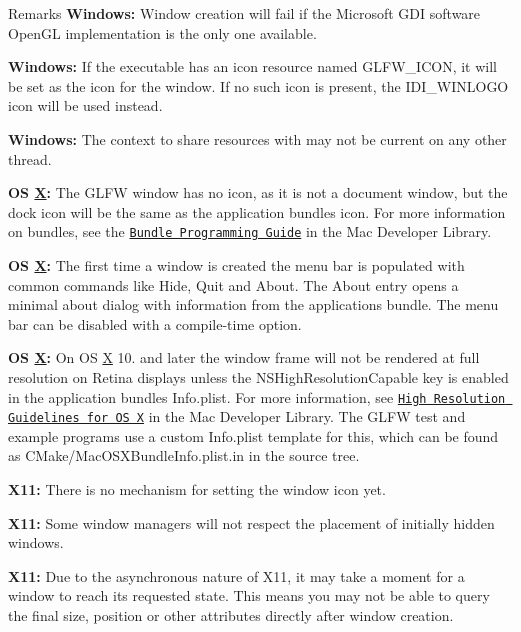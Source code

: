 \begin{DoxyRemark}{Remarks}
{\bfseries Windows\+:} Window creation will fail if the Microsoft G\+D\+I software Open\+G\+L implementation is the only one available.

{\bfseries Windows\+:} If the executable has an icon resource named {\ttfamily G\+L\+F\+W\+\_\+\+I\+C\+O\+N,} it will be set as the icon for the window. If no such icon is present, the {\ttfamily I\+D\+I\+\_\+\+W\+I\+N\+L\+O\+G\+O} icon will be used instead.

{\bfseries Windows\+:} The context to share resources with may not be current on any other thread.

{\bfseries O\+S \hyperlink{structX}{X}\+:} The G\+L\+F\+W window has no icon, as it is not a document window, but the dock icon will be the same as the application bundle\textquotesingle{}s icon. For more information on bundles, see the \href{https://developer.apple.com/library/mac/documentation/CoreFoundation/Conceptual/CFBundles/}{\tt Bundle Programming Guide} in the Mac Developer Library.

{\bfseries O\+S \hyperlink{structX}{X}\+:} The first time a window is created the menu bar is populated with common commands like Hide, Quit and About. The About entry opens a minimal about dialog with information from the application\textquotesingle{}s bundle. The menu bar can be disabled with a compile-\/time option.

{\bfseries O\+S \hyperlink{structX}{X}\+:} On O\+S \hyperlink{structX}{X} 10. and later the window frame will not be rendered at full resolution on Retina displays unless the {\ttfamily N\+S\+High\+Resolution\+Capable} key is enabled in the application bundle\textquotesingle{}s {\ttfamily Info.\+plist}. For more information, see \href{https://developer.apple.com/library/mac/documentation/GraphicsAnimation/Conceptual/HighResolutionOSX/Explained/Explained.html}{\tt High Resolution Guidelines for O\+S X} in the Mac Developer Library. The G\+L\+F\+W test and example programs use a custom {\ttfamily Info.\+plist} template for this, which can be found as {\ttfamily C\+Make/\+Mac\+O\+S\+X\+Bundle\+Info.\+plist.\+in} in the source tree.

{\bfseries X11\+:} There is no mechanism for setting the window icon yet.

{\bfseries X11\+:} Some window managers will not respect the placement of initially hidden windows.

{\bfseries X11\+:} Due to the asynchronous nature of X11, it may take a moment for a window to reach its requested state. This means you may not be able to query the final size, position or other attributes directly after window creation.
\end{DoxyRemark}
